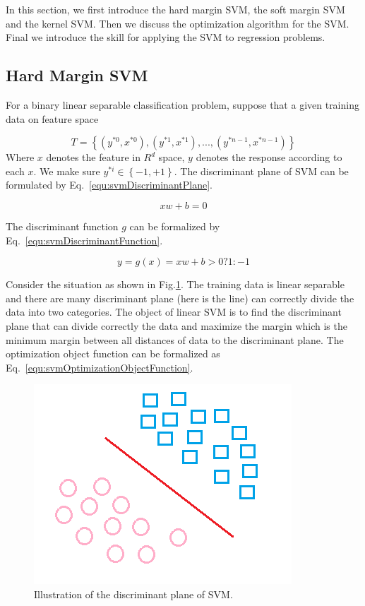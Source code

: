 \documentclass[runningheads,openany]{xhlPaper}
\begin{document}
In this section, we first introduce the hard margin SVM, the soft margin SVM and the kernel SVM. Then we discuss the optimization algorithm for the SVM. Final we introduce the skill for applying the SVM to regression problems.

\subsection{Hard Margin SVM}
For a binary linear separable classification problem, suppose that a given training data on feature space 

\begin{displaymath}
T = \left\{ {\left( {{y^{*0}},{x^{*0}}} \right),\left( {{y^{*1}},{x^{*1}}} \right),...,\left( {{y^{*n - 1}},{x^{*n - 1}}} \right)} \right\}
\end{displaymath}
Where $x$ denotes the feature in $R^d$ space, $y$ denotes the response according to each $x$. We make sure $y^{*i} \in \left\{ { - 1, + 1} \right\} $. The discriminant plane of SVM can be formulated by Eq.~\ref{equ:svmDiscriminantPlane}.

\begin{equation}
\label{equ:svmDiscriminantPlane}
xw + b = 0
\end{equation}

The discriminant function $g$ can be formalized by Eq.~\ref{equ:svmDiscriminantFunction}. 

\begin{equation}
\label{equ:svmDiscriminantFunction}
y = g\left(x \right) = xw + b > 0?1: - 1
\end{equation} 

Consider the situation as shown in Fig.\ref{fig:svmEuclidSpace}. The training data is linear separable and there are many discriminant plane (here is the line) can correctly divide the data into two categories. The object of linear SVM is to find the discriminant plane that can divide correctly the data and maximize the margin which is the minimum margin between all distances of data to the discriminant plane. The optimization object function can be formalized as Eq.~\ref{equ:svmOptimizationObjectFunction}.

\begin{figure}
\centering
\includegraphics[width=0.5\linewidth]{svmEuclidSpace}
\caption{Illustration of the discriminant plane of SVM.}
\label{fig:svmEuclidSpace}
\end{figure}
\end{document}
